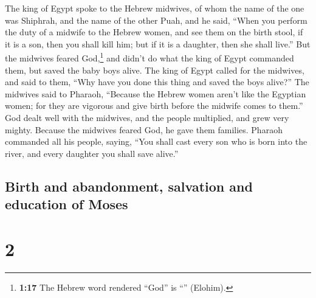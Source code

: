  The king of Egypt spoke to the Hebrew midwives, of whom
the name of the one was Shiphrah, and the name of the other Puah,
 and he said, ``When you perform the duty of a midwife to
the Hebrew women, and see them on the birth stool, if it is a son, then
you shall kill him; but if it is a daughter, then she shall live.''
 But the midwives feared God,\footnote{\textbf{1:17} The
  Hebrew word rendered ``God'' is ``'' (Elohim).} and
didn't do what the king of Egypt commanded them, but saved the baby boys
alive.  The king of Egypt called for the midwives, and
said to them, ``Why have you done this thing and saved the boys alive?''
 The midwives said to Pharaoh, ``Because the Hebrew women
aren't like the Egyptian women; for they are vigorous and give birth
before the midwife comes to them.''  God dealt well with
the midwives, and the people multiplied, and grew very mighty.
 Because the midwives feared God, he gave them families.
 Pharaoh commanded all his people, saying, ``You shall
cast every son who is born into the river, and every daughter you shall
save alive.''

\hypertarget{birth-and-abandonment-salvation-and-education-of-moses}{%
\subsection{Birth and abandonment, salvation and education of
Moses}\label{birth-and-abandonment-salvation-and-education-of-moses}}

\hypertarget{section-1}{%
\section{2}\label{section-1}}

